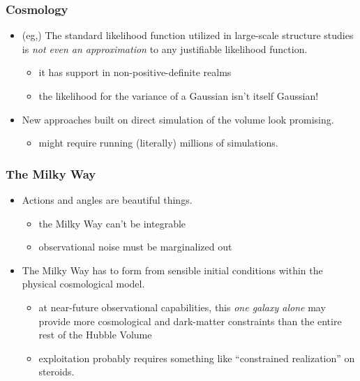 \documentclass[pdftex]{beamer}
\begin{document}
\begin{frame}
  \frametitle{Cosmology}
  \begin{itemize}
  \item (eg,) The standard likelihood function utilized in large-scale
    structure studies is \emph{not even an approximation} to any justifiable
    likelihood function.
    \begin{itemize}
    \item it has support in non-positive-definite realms
    \item the likelihood for the variance of a Gaussian isn't itself Gaussian!
    \end{itemize}
  \item New approaches built on direct simulation of the volume look promising.
    \begin{itemize}
    \item might require running (literally) millions of simulations.
    \end{itemize}
  \end{itemize}
\end{frame}

\begin{frame}
  \frametitle{The Milky Way}
  \begin{itemize}
  \item Actions and angles are beautiful things.
    \begin{itemize}
    \item the Milky Way can't be integrable
    \item observational noise must be marginalized out
    \end{itemize}
  \item The Milky Way has to form from sensible initial conditions
    within the physical cosmological model.
    \begin{itemize}
    \item at near-future observational capabilities, this \emph{one galaxy
      alone} may provide more cosmological and dark-matter constraints than the entire
      rest of the Hubble Volume
    \item exploitation probably requires something like ``constrained
      realization'' on steroids.
    \end{itemize}
  \end{itemize}
\end{frame}
\end{document}
